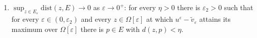 \begin{theorem}
\begin{enumerate}
\begin{enumerate}
  \item $u^{\varepsilon}-\tilde v_{\varepsilon}$ attains its maximum over
    $\overline{\Omega[\varepsilon]}$ at some point of $\Omega[\varepsilon]$, and the maximum
    value is $\ge\tau$;
  \item every point of $\overline{\Omega[\varepsilon]}$ at which
    $u^{\varepsilon}-\tilde v_{\varepsilon}$ attains its maximum over
    $\overline{\Omega[\varepsilon]}$ lies in $\Omega[\varepsilon]$;
  \end{enumerate}
\item $\sup_{z\in E_\varepsilon}\mathrm{dist}(z,E)\to0$ as $\varepsilon\to0^{+}$: for every
  $\eta>0$ there is $\varepsilon_2>0$ such that for every $\varepsilon\in(0,\varepsilon_2)$
  and every $z\in\Omega[\varepsilon]$ at which $u^{\varepsilon}-\tilde v_{\varepsilon}$
  attains its maximum over $\overline{\Omega[\varepsilon]}$ there is $p\in E$ with
  $d(z,p)<\eta$.
\end{enumerate}
\end{theorem}
